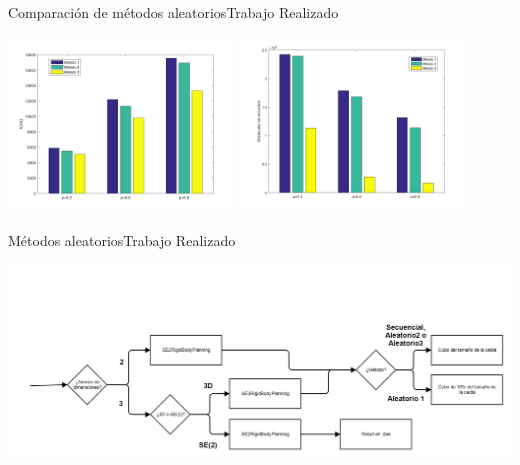 \documentclass[10pt]{beamer}
\begin{document}
\begin{frame}{Comparación de métodos aleatorios}{Trabajo Realizado}
\vfill
\begin{center}
\includegraphics[width=0.45\textwidth]{T3t1}
\includegraphics[width=0.45\textwidth]{T3o2}
\end{center}
\end{frame}

\begin{frame}{Métodos aleatorios}{Trabajo Realizado}
\begin{center}
\includegraphics[width=\textwidth,height=0.8\textheight,keepaspectratio]{seleccion}	
\end{center}
\end{frame}
\end{document}
